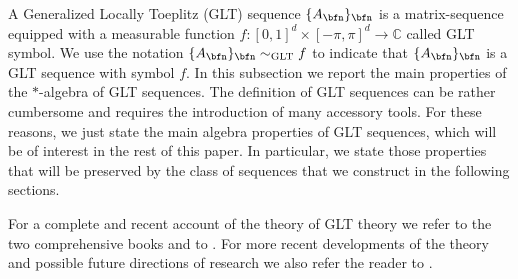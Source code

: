 \documentclass{amsart}
\begin{document}
A Generalized Locally Toeplitz (GLT) sequence $\{A_{\bfn}\}_\bfn$ is a matrix-sequence equipped with a measurable function $f:[0,1]^{d} \times [-\pi,\pi]^d \to \mathbb{C}$ called GLT symbol. We use the notation $\{A_{\bfn}\}_{\bfn} \sim_{\text{GLT}} f$ to indicate that $\{A_{\bfn}\}_{\bfn}$ is a GLT sequence with symbol $f$. In this subsection we report the main properties of the $*$-algebra of GLT sequences. The definition of GLT sequences can be rather cumbersome and requires the introduction of many accessory tools. For these reasons, we just state the main algebra properties of GLT sequences, which will be of interest in the rest of this paper. In particular, we state those properties that will be preserved by the class of sequences that we construct in the following sections.

For a complete and recent account of the theory of GLT theory we refer to the two comprehensive books \cite{glt-book-1, glt-book-2} and to \cite{GLT-block1D,GLT-blockdD}. For more recent developments of the theory and possible future directions of research we also refer the reader to \cite{AFGS26,AGS26,gacs,ASPSC25,BFFS,Barb,BGMS}.
\end{document}
